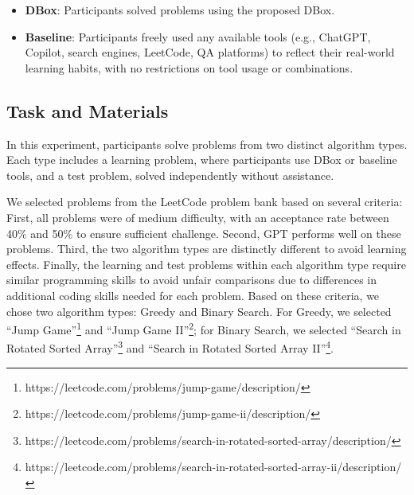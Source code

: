 \begin{itemize}
    \item \textbf{DBox}: Participants solved problems using the proposed DBox.
    \item \textbf{Baseline}: Participants freely used any available tools (e.g., ChatGPT, Copilot, search engines, LeetCode, QA platforms) to reflect their real-world learning habits, with no restrictions on tool usage or combinations.
\end{itemize}






\subsection{Task and Materials}
In this experiment, participants solve problems from two distinct algorithm types. Each type includes a learning problem, where participants use DBox or baseline tools, and a test problem, solved independently without assistance.

We selected problems from the LeetCode problem bank based on several criteria: First, all problems were of medium difficulty, with an acceptance rate between 40\% and 50\% to ensure sufficient challenge. Second, GPT performs well on these problems. Third, the two algorithm types are distinctly different to avoid learning effects. Finally, the learning and test problems within each algorithm type require similar programming skills to avoid unfair comparisons due to differences in additional coding skills needed for each problem. Based on these criteria, we chose two algorithm types: Greedy and Binary Search. For Greedy, we selected ``Jump Game''\footnote{https://leetcode.com/problems/jump-game/description/} and ``Jump Game II''\footnote{https://leetcode.com/problems/jump-game-ii/description/}; for Binary Search, we selected ``Search in Rotated Sorted Array''\footnote{https://leetcode.com/problems/search-in-rotated-sorted-array/description/} and ``Search in Rotated Sorted Array II''\footnote{https://leetcode.com/problems/search-in-rotated-sorted-array-ii/description/}.



